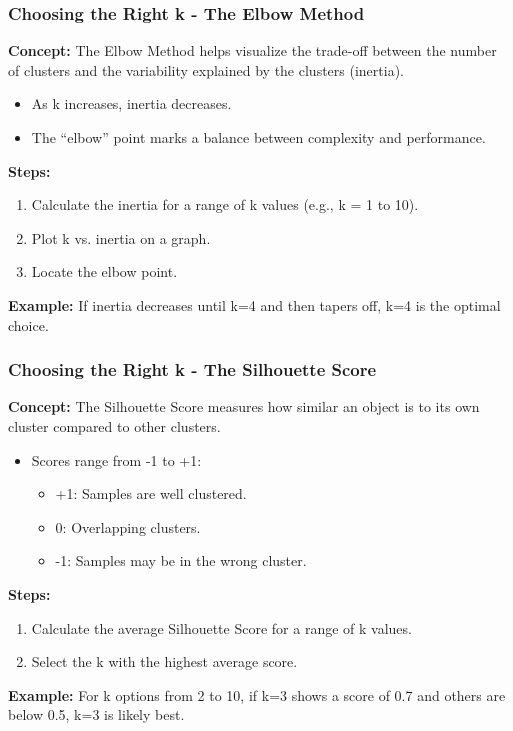 \documentclass[aspectratio=169]{beamer}
\begin{document}
\begin{frame}[fragile]
    \frametitle{Choosing the Right k - The Elbow Method}
    \textbf{Concept:}
    The Elbow Method helps visualize the trade-off between the number of clusters and the variability explained by the clusters (inertia). 
    \begin{itemize}
        \item As k increases, inertia decreases.
        \item The “elbow” point marks a balance between complexity and performance.
    \end{itemize}

    \textbf{Steps:}
    \begin{enumerate}
        \item Calculate the inertia for a range of k values (e.g., k = 1 to 10).
        \item Plot k vs. inertia on a graph.
        \item Locate the elbow point.
    \end{enumerate}
    
    \textbf{Example:}
    If inertia decreases until k=4 and then tapers off, k=4 is the optimal choice.
\end{frame}

\begin{frame}[fragile]
    \frametitle{Choosing the Right k - The Silhouette Score}
    \textbf{Concept:}
    The Silhouette Score measures how similar an object is to its own cluster compared to other clusters.
    \begin{itemize}
        \item Scores range from -1 to +1:
        \begin{itemize}
            \item +1: Samples are well clustered.
            \item 0: Overlapping clusters.
            \item -1: Samples may be in the wrong cluster.
        \end{itemize}
    \end{itemize}

    \textbf{Steps:}
    \begin{enumerate}
        \item Calculate the average Silhouette Score for a range of k values.
        \item Select the k with the highest average score.
    \end{enumerate}
    
    \textbf{Example:}
    For k options from 2 to 10, if k=3 shows a score of 0.7 and others are below 0.5, k=3 is likely best.
\end{frame}
\end{document}
